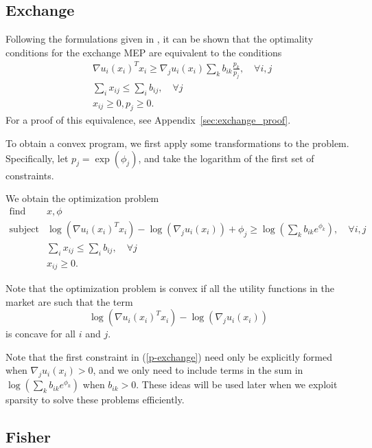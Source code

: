 \documentclass[12pt]{article}
\begin{document}
\subsection{Exchange}
\label{sec:convex_form_exchange}
Following the formulations given in \cite{jain2007polynomial, chen2007note, nenakov1983algorithm}, it can be shown that the optimality conditions for 
the exchange MEP are equivalent to the conditions
\[
\begin{array}{ll}
& \nabla u_i(x_i)^T x_i \geq  \nabla_j u_i(x_i) \sum_k b_{ik} \frac{p_k}{p_j}, \quad \forall i,j\\
& \sum_i x_{ij} \leq \sum_i b_{ij},\quad \forall j\\
& x_{ij} \geq 0, p_j \geq 0.
\end{array}
\]
For a proof of this equivalence, see Appendix~\ref{sec:exchange_proof}.

To obtain a convex program, we first apply some transformations to the
problem.
Specifically, let $p_j = \exp(\phi_j)$, and take the logarithm of
the first set of constraints.

We obtain the optimization problem %
\begin{equation}
\label{p-exchange}
\begin{array}{ll}
\mbox{find} & x, \phi \\
\mbox{subject to} & \log(\nabla u_i(x_i)^T x_i) - \log(\nabla_j u_i(x_i)) + \phi_j 
\geq \log(\sum_k b_{ik} e^{\phi_k}),\quad \forall i,j\\
& \sum_i x_{ij} \leq \sum_i b_{ij},\quad \forall j\\
& x_{ij} \geq 0.
\end{array}
\end{equation}

Note that the optimization problem is convex if all the utility functions
in the market are such that the term
\begin{equation}
\label{e-util-constraint}
\log(\nabla u_i(x_i)^T x_i) - \log(\nabla_j u_i(x_i))
\end{equation}
is concave for all $i$ and $j$.

Note that the first constraint in (\ref{p-exchange}) need only be explicitly formed when
$\nabla_j u_i(x_i) > 0$, and we only need to include terms in the sum in
$\log(\sum_k b_{ik} e^{\phi_k})$ when $b_{ik} > 0$.
These ideas will be used later when we exploit sparsity to solve these
problems efficiently.

\subsection{Fisher}
\label{sec:convex_form_fisher}
\end{document}
